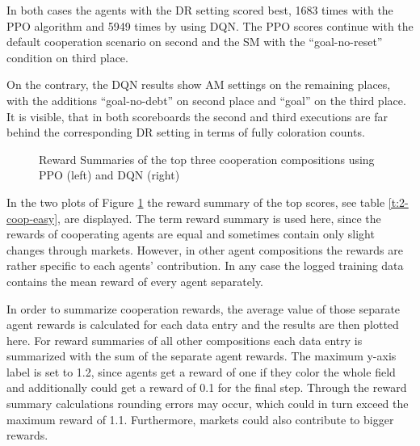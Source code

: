 In both cases the agents with the DR setting scored best, 1683 times with the PPO algorithm and 5949 times by using DQN. The PPO scores continue with the default cooperation scenario on second and the SM with the ``goal-no-reset'' condition on third place. 

On the contrary, the DQN results show AM settings on the remaining places, with the additions ``goal-no-debt'' on second place and ``goal'' on the third place. It is visible, that in both scoreboards the second and third executions are far behind the corresponding DR setting in terms of fully coloration counts.

\begin{figure}[hpbt]
    \centering
    \hspace{0.01\textwidth}
    \caption[Reward Summaries of the Top Cooperation Modes in a 5x5 Environment]{Reward Summaries of the top three cooperation compositions using PPO (left) and DQN (right)}
    \label{fig:multipic_plots_coop_easy} 
\end{figure}

In the two plots of Figure \ref{fig:multipic_plots_coop_easy} the reward summary of the top scores, see table \ref{t:2-coop-easy}, are displayed. The term reward summary is used here, since the rewards of cooperating agents are equal and sometimes contain only slight changes through markets. However, in other agent compositions the rewards are rather specific to each agents' contribution. In any case the logged training data contains the mean reward of every agent separately. 

In order to summarize cooperation rewards, the average value of those separate agent rewards is calculated for each data entry and the results are then plotted here. For reward summaries of all other compositions each data entry is summarized with the sum of the separate agent rewards. The maximum y-axis label is set to 1.2, since agents get a reward of one if they color the whole field and additionally could get a reward of 0.1 for the final step. Through the reward summary calculations rounding errors may occur, which could in turn exceed the maximum reward of 1.1. Furthermore, markets could also contribute to bigger rewards. 

